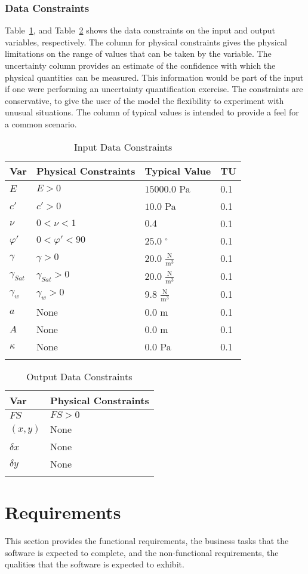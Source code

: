 \documentclass[12pt]{article}
\begin{document}
\subsubsection{Data Constraints}
\label{Sec:DataConstraints}
Table~\ref{Table:InDataConstraints}, and Table~\ref{Table:OutDataConstraints} shows the data constraints on the input and output variables, respectively. The column for physical constraints gives the physical limitations on the range of values that can be taken by the variable. The uncertainty column provides an estimate of the confidence with which the physical quantities can be measured. This information would be part of the input if one were performing an uncertainty quantification exercise. The constraints are conservative, to give the user of the model the flexibility to experiment with unusual situations. The column of typical values is intended to provide a feel for a common scenario.
\begin{longtable}{l l l l}
\toprule
Var & Physical Constraints & Typical Value & TU
\\
\midrule
$E$ & $E>0$ & $15000.0$ Pa & 0.1
\\
$c'$ & $c'>0$ & $10.0$ Pa & 0.1
\\
$ν$ & $0<ν<1$ & $0.4$ & 0.1
\\
$φ'$ & $0<φ'<90$ & $25.0$ ${}^{\circ}$ & 0.1
\\
$γ$ & $γ>0$ & $20.0$ $\frac{\text{N}}{\text{m}^{3}}$ & 0.1
\\
${γ_{Sat}}$ & ${γ_{Sat}}>0$ & $20.0$ $\frac{\text{N}}{\text{m}^{3}}$ & 0.1
\\
${γ_{w}}$ & ${γ_{w}}>0$ & $9.8$ $\frac{\text{N}}{\text{m}^{3}}$ & 0.1
\\
$a$ & None & $0.0$ m & 0.1
\\
$A$ & None & $0.0$ m & 0.1
\\
$κ$ & None & $0.0$ Pa & 0.1
\\
\bottomrule
\caption{Input Data Constraints}
\label{Table:InDataConstraints}
\end{longtable}
\begin{longtable}{l l}
\toprule
Var & Physical Constraints
\\
\midrule
$FS$ & $FS>0$
\\
$(x,y)$ & None
\\
$δx$ & None
\\
$δy$ & None
\\
\bottomrule
\caption{Output Data Constraints}
\label{Table:OutDataConstraints}
\end{longtable}
\section{Requirements}
\label{Sec:Requirements}
This section provides the functional requirements, the business tasks that the software is expected to complete, and the non-functional requirements, the qualities that the software is expected to exhibit.
\end{document}
